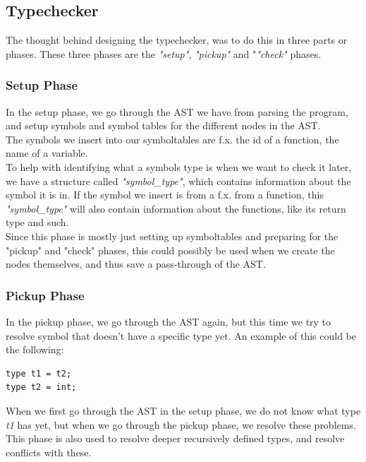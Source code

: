 \documentclass[a4paper,10pt,titlepage]{report}
\begin{document}
\subsection{Typechecker}
The thought behind designing the typechecker, was to do this in three parts or phases. These three phases are the \textit{"setup"}, \textit{"pickup"} and "\textit{"check"} phases.

\subsubsection{Setup Phase}
In the setup phase, we go through the AST we have from parsing the program, and setup symbols and symbol tables for the different nodes in the AST.\\
The symbols we insert into our symboltables are f.x. the id of a function, the name of a variable.\\
To help with identifying what a symbols type is when we want to check it later, we have a structure called \textit{"symbol\_type"}, which contains information about the symbol it is in. If the symbol we insert is from a f.x. from a function, this \textit{"symbol\_type"} will also contain information about the functions, like its return type and such.\\
Since this phase is mostly just setting up symboltables and preparing for the "pickup" and "check" phases, this could possibly be used when we create the nodes themselves, and thus save a pass-through of the AST.

\subsubsection{Pickup Phase}
In the pickup phase, we go through the AST again, but this time we try to resolve symbol that doesn't have a specific type yet. An example of this could be the following:
\begin{lstlisting}
type t1 = t2;
type t2 = int;
\end{lstlisting}
When we first go through the AST in the setup phase, we do not know what type \textit{t1} has yet, but when we go through the pickup phase, we resolve these problems. This phase is also used to resolve deeper recursively defined types, and resolve conflicts with these.
\end{document}
